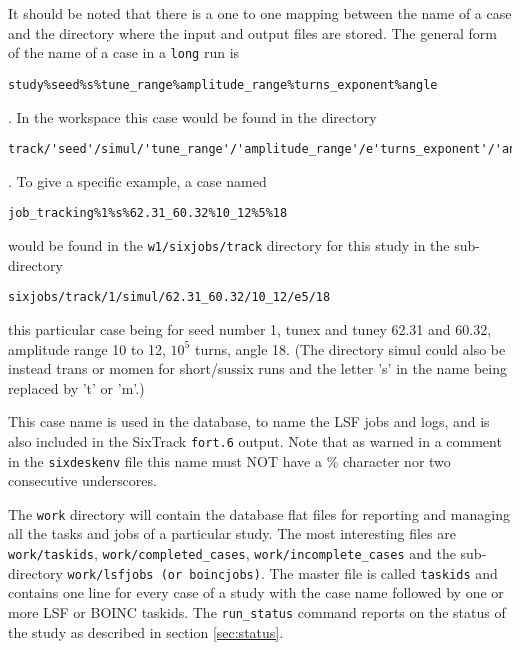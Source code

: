 \documentclass{cernatsnote}    %
\begin{document}
It should be noted that there is a one to one mapping between the name of a case
and the directory where the input and output files are stored. The general form of
the name of a case in a {\tt long} run is 
\begin{verbatim}
study%seed%s%tune_range%amplitude_range%turns_exponent%angle
\end{verbatim}.
In the workspace this case would be found in the directory
\begin{verbatim}
track/'seed'/simul/'tune_range'/'amplitude_range'/e'turns_exponent'/'angle'
\end{verbatim}.
To give a specific example, a case named
\begin{verbatim}
job_tracking%1%s%62.31_60.32%10_12%5%18
\end{verbatim} would be found in the {\tt w1/sixjobs/track} directory for 
this study in the sub-directory
\begin{verbatim}
sixjobs/track/1/simul/62.31_60.32/10_12/e5/18
\end{verbatim}
this particular case being for seed number 1, tunex and tuney 62.31 and 60.32,
amplitude range 10 to 12, $10^5$ turns, angle 18. (The directory simul could also
be instead trans or momen for short/sussix runs and the letter 's' in the
name being replaced by 't' or 'm'.)
 
This case name is used in the database, to name the LSF jobs and logs, and is
also included in the SixTrack {\tt fort.6} output. Note that as warned in a
comment in the {\tt sixdeskenv} file this name must
NOT have a \% character nor two consecutive underscores.

The {\tt work} directory will contain the database flat files for reporting
and managing all the tasks and jobs of a particular study.
The most interesting files are {\tt work/taskids}, {\tt work/completed\_cases},
{\tt work/incomplete\_cases} and the sub-directory {\tt work/lsfjobs (or boincjobs)}.
The master file is called {\tt taskids} and contains one line for every case of
a study with the case name followed by one or more LSF or BOINC taskids. The {\tt run\_status}
command reports on the status of the study as described in section \ref{sec:status}.
\end{document}
